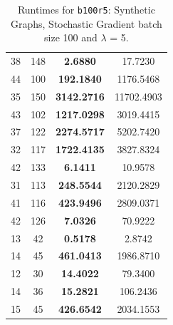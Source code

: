 \documentclass{article}
\begin{document}
\begin{table}[h]
\begin{tabular}{lccc}
38 & 148 & \textbf{2.6880} & 17.7230 \\
44 & 100 & \textbf{192.1840} & 1176.5468 \\
35 & 150 & \textbf{3142.2716} & 11702.4903 \\
43 & 102 & \textbf{1217.0298} & 3019.4415 \\
37 & 122 & \textbf{2274.5717} & 5202.7420 \\
32 & 117 & \textbf{1722.4135} & 3827.8324 \\
42 & 133 & \textbf{6.1411} & 10.9578 \\
31 & 113 & \textbf{248.5544} & 2120.2829 \\
41 & 116 & \textbf{423.9496} & 2809.0371 \\
42 & 126 & \textbf{7.0326} & 70.9222 \\
13 & 42 & \textbf{0.5178} & 2.8742 \\
14 & 45 & \textbf{461.0413} & 1986.8710 \\
12 & 30 & \textbf{14.4022} & 79.3400 \\
14 & 36 & \textbf{15.2821} & 106.2436 \\
15 & 45 & \textbf{426.6542} & 2034.1553 \\
\bottomrule
\end{tabular}
\caption{Runtimes for \texttt{b100r5}: Synthetic Graphs, Stochastic Gradient batch size 100 and $\lambda$ = 5.}
\end{table}
\end{document}
